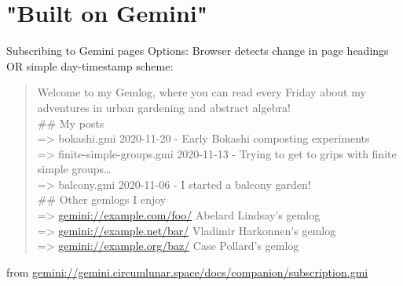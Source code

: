 \documentclass[presentation, 11pt,  aspectratio=169]{beamer}
\begin{document}
\section*{"Built on Gemini"}
\label{sec:org23dcc19}
\begin{frame}[label={sec:orge9f3035}]{Subscribing to Gemini pages}
Options: Browser detects change in page headings OR simple day-timestamp scheme:\\
\begin{footnotesize}
\begin{quote}
Welcome to my Gemlog, where you can read every Friday about my adventures in urban gardening and abstract algebra!\\

\#\# My posts\\
=> \alert{bokashi.gmi              2020-11-20 - Early Bokashi composting experiments}\\
=> \alert{finite-simple-groups.gmi 2020-11-13 - Trying to get to grips with finite simple groups\ldots{}}\\
=> \alert{balcony.gmi              2020-11-06 - I started a balcony garden!}\\

\#\# Other gemlogs I enjoy\\
=> \href{gemini://example.com/foo/}{gemini://example.com/foo/}    Abelard Lindsay's gemlog\\
=> \href{gemini://example.net/bar/}{gemini://example.net/bar/}    Vladimir Harkonnen's gemlog\\
=> \href{gemini://example.org/baz/}{gemini://example.org/baz/}    Case Pollard's gemlog\\
\end{quote}
\end{footnotesize}
from \href{gemini://gemini.circumlunar.space/docs/companion/subscription.gmi}{gemini://gemini.circumlunar.space/docs/companion/subscription.gmi}\\
\end{frame}
\end{document}
